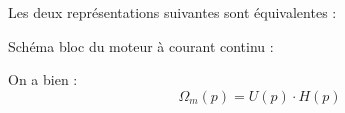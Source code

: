 \documentclass[11pt,oneside]{article}
\begin{document}
\begin{rem}
Les deux représentations suivantes sont équivalentes :

\begin{minipage}[c]{.45\linewidth}
\begin{center}
\end{center}
\end{minipage}\hfill
\begin{minipage}[c]{.45\linewidth}
\begin{center}
\end{center}
\end{minipage}

\end{rem}

\begin{exemple}
Schéma bloc du moteur à courant continu :
\begin{center}

On a bien :
$$
\Omega_m(p) = U(p) \cdot H(p)
$$
\end{center}

\end{exemple}
\end{document}
